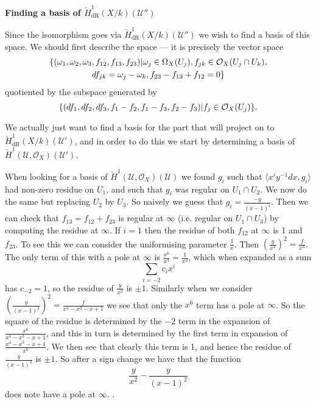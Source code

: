\documentclass[draft, 11pt]{article} %
\theoremstyle{plain}
\theoremstyle{remark}
\newcommand{\cO}{{\cal O}}
\newcommand{\cU}{{\mathcal U}}
\newcommand{\cechhone}{\check{H}^1(\mathcal U,\mathcal O_X)}
\newcommand{\cechderhamhone}{\check{H}_{\text {dR}}^1(X/k)}
\begin{document}
{\bf Finding a basis of $\cechderhamhone (\cU '')$}

Since the isomorphism goes via $\cechderhamhone (\cU'')$ we wish to find a basis of this space.
We should first describe the space --- it is precisely the vector space
\begin{multline}\label{u''conditions}
\{ ( \omega_1, \omega_2, \omega_3, f_{12}, f_{13}, f_{23}) | \omega_j \in \Omega_X(U_j), f_{jk} \in \cO_X(U_j \cap U_k),\\ df_{jk} = \omega_j - \omega_k, f_{23} - f_{13} + f_{12} = 0\}
\end{multline}
quotiented by the subspace generated by
\begin{equation*}
\{ (df_1, df_2, df_3, f_1-f_2, f_1-f_3, f_2-f_3) | f_j \in \cO_X(U_j) \}.
\end{equation*}

We actually just want to find a basis for the part that will project on to $\cechderhamhone (\cU')$, and in order to do this we start by determining a basis of $\cechhone (\cU')$.

When looking for a basis of $\cechhone (\cU)$ we found $g_i$ such that $\langle x^iy^{-1}dx, g_i \rangle$ had non-zero residue on $U_1$, and such that $g_i$ was regular on $U_1 \cap U_2$.
We now do the same but replacing $U_2$ by $U_3$.
So naively we guess that $g_i = \frac{-y}{(x-1)^i}$.
Then we can check that $f_{13} = f_{12} + f_{23}$ is regular at $\infty$ (i.e. regular on $U_1 \cap U_3$) by computing the residue at $\infty$.
If $i = 1$ then the residue of both $f_{12}$  at $\infty$ is 1 and $f_{23}$.
To see this we can consider the uniformising parameter $\frac{1}{x}$.
Then $\left( \frac{y}{x^2} \right)^2 = \frac{f}{x^4}$.
The only term of this with a pole at $\infty$ is $\frac{x^6}{x^4}= \frac{1}{x^2}$, which when expanded as a sum
\[
\sum_{i=-2} c_i x^i
\]
has $c_{-2} = 1$, so the residue of $\frac{y}{x^2}$ is $\pm 1$.
Similarly when we consider $\left( \frac{y}{(x-1)^2} \right)^2 = \frac{f}{x^4 - x^3 - x +1}$ we see that only the $x^6$ term has a pole at $\infty$.
So the square of the residue is determined by the $-2$ term in the expansion of $\frac{x^6}{x^4 - x^3 - x +1}$, and this in turn is determined by the first term in expansion of $\frac{x^4 - x^3 - x +1}{x^6}$. 
We then see that clearly this term is 1, and hence the residue of $\frac{y}{(x-1)^2}$ is $\pm 1$.
So after a sign change we have that the function 
\[
\frac{y}{x^2}  - \frac{y}{(x-1)^2}
\]
does note have a pole at $\infty$.
.
\end{document}

